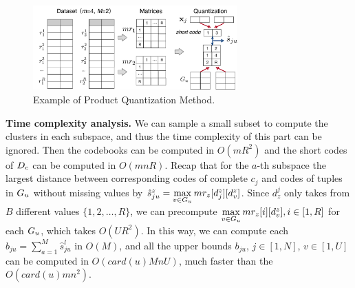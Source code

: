 \begin{figure}[t]
    \centering
    \includegraphics[width=0.7\textwidth]{figs/pq}
    \caption{Example of Product Quantization Method.}
    \label{fig:codebook}
\end{figure}

\noindent \textbf{Time complexity analysis.}
We can sample a small subset to compute the clusters in each subspace, and thus the time complexity of this part can be ignored. 
%
Then the codebooks can be computed in $O(mR^2)$ and the short codes of $D_c$ can be computed in $O(mnR)$. 
%
Recap that for the $a$-th subspace the largest distance between corresponding codes of complete $c_j$ and codes of tuples in $G_u$ without missing values by $\hat{s}_{ju}^z = \max\limits_{v\in G_u}mr_z[d_{j}^z][d_v^z]$. Since $d_z^j$ only takes from $B$ different values $\{1, 2, \dots, R\}$, we can precompute $\max\limits_{v\in G_u}mr_z[i][d_v^z], i\in[1, R]$ for each $G_u$, which takes $O(UR^2)$. In this way, we can compute each $b_{ju}=\sum_{a=1}^{M}\hat{s}^l_{ju}$ in $O(M)$, and all the upper bounds $b_{ju}$, $j\in [1,N]$, $v\in [1,U]$ can be computed in  $O(card(u)MnU)$, much faster than the $O(card(u)mn^2)$.


